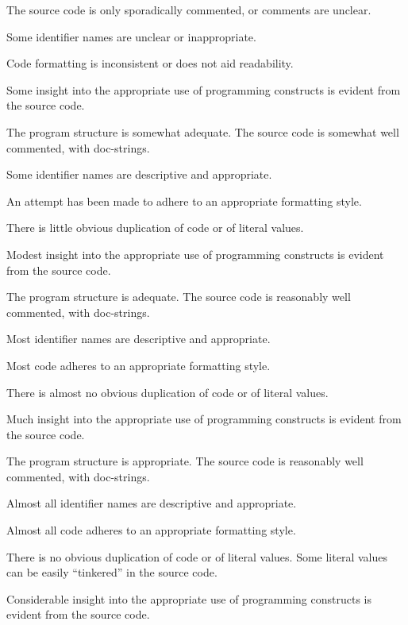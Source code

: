 \documentclass{../../fal_assignment}
\begin{document}
\begin{markingrubric}
        \grade The source code is only sporadically commented, or comments are unclear.
            \par Some identifier names are unclear or inappropriate.
            \par Code formatting is inconsistent or does not aid readability.
            \par Some insight into the appropriate use of programming constructs is evident from the source code.
            \par The program structure is somewhat adequate.
        \grade The source code is somewhat well commented, with doc-strings.
            \par Some identifier names are descriptive and appropriate.
            \par An attempt has been made to adhere to an appropriate formatting style.
             \par There is little obvious duplication of code or of literal values.   
             \par Modest insight into the appropriate use of programming constructs is evident from the source code.
             \par The program structure is adequate.    
        \grade The source code is reasonably well commented, with doc-strings.
            \par Most identifier names are descriptive and appropriate.
            \par Most code adheres to an appropriate formatting style.
             \par There is almost no obvious duplication of code or of literal values.   
             \par Much insight into the appropriate use of programming constructs is evident from the source code.
            \par  The program structure is appropriate.
        \grade The source code is reasonably well commented, with doc-strings.
            \par Almost all identifier names are descriptive and appropriate.
            \par Almost all code adheres to an appropriate formatting style.
             \par There is no obvious duplication of code or of literal values. Some literal values can be easily ``tinkered'' in the source code. 
             \par Considerable insight into the appropriate use of programming constructs is evident from the source code.

\end{markingrubric}
\end{document}
